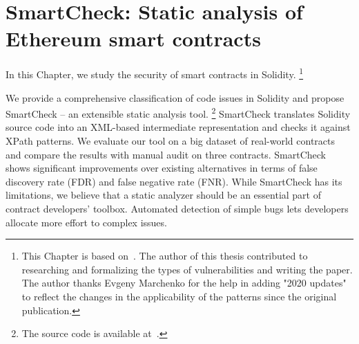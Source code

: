 \chapter{SmartCheck: Static analysis of Ethereum smart contracts}

\label{Chapter11SmartCheck}



In this Chapter, we study the security of smart contracts in Solidity.
\footnote{This Chapter is based on~\cite{Tikhomirov2018}. The author of this thesis contributed to researching and formalizing the types of vulnerabilities and writing the paper. The author thanks Evgeny Marchenko for the help in adding "2020 updates" to reflect the changes in the applicability of the patterns since the original publication.}

We provide a comprehensive classification of code issues in Solidity and propose SmartCheck -- an extensible static analysis tool.
\footnote{The source code is available at~\cite{SmartCheck}.}
SmartCheck translates Solidity source code into an XML-based intermediate representation and checks it against XPath patterns.
We evaluate our tool on a big dataset of real-world contracts and compare the results with manual audit on three contracts.
SmartCheck shows significant improvements over existing alternatives in terms of false discovery rate (FDR) and false negative rate (FNR).
While SmartCheck has its limitations, we believe that a static analyzer should be an essential part of contract developers' toolbox.
Automated detection of simple bugs lets developers allocate more effort to complex issues.










